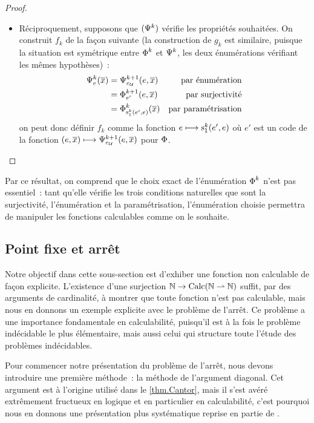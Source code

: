 \begin{proof}
\begin{itemize}
  \item Réciproquement, supposons que $(\Psi_{}^{k})$ vérifie les propriétés
    souhaitées. On construit $f_k$ de la façon suivante (la construction de
    $g_k$ est similaire, puisque la situation est symétrique entre $\operatorname{\Phi}_{}^{k}$
    et $\Psi_{}^{k}$, les deux énumérations vérifiant les mêmes hypothèses)~:
    \begin{align*}
      \Psi_{e}^{k}(\overline{x})
      &= \Psi_{e_{\mathcal{U}}}^{k+1}(e,\overline{x}) &\text{par énumération}\\
      &= \operatorname{\Phi}_{e'}^{k+1}(e,\overline{x}) &\text{par surjectivité}\\
      &= \operatorname{\Phi}_{\mathrm{s}_{1}^{k}(e',e)}^{k}(\overline{x}) &\text{par paramétrisation}
    \end{align*}
    on peut donc définir $f_k$ comme la fonction
    $e \longmapsto \mathrm{s}_{1}^{k}(e',e)$ où $e'$ est un code de la fonction
    $(e, \overline{x}) \longmapsto \Psi_{e_{\mathcal{U}}}^{k+1}(e, \overline{x})$ pour $\operatorname{\Phi}$.
    \qedhere
  \end{itemize}
\end{proof}

Par ce résultat, on comprend que le choix exact de l'énumération $\operatorname{\Phi}_{}^{k}$
n'est pas essentiel~: tant qu'elle vérifie les trois conditions naturelles que
sont la surjectivité, l'énumération et la paramétrisation, l'énumération
choisie permettra de manipuler les fonctions calculables comme on le souhaite.

\subsection{Point fixe et arrêt}

Notre objectif dans cette sous-section est d'exhiber une fonction non calculable
de façon explicite. L'existence d'une surjection
$\mathbb N \to \operatorname{Calc}(\mathbb N \rightharpoonup \mathbb N)$
suffit, par des arguments de cardinalité, à montrer que toute fonction n'est pas
calculable, mais nous en donnons un exemple explicite avec le problème de
l'arrêt. Ce problème a une importance fondamentale en calculabilité, puisqu'il
est à la fois le problème indécidable le plus élémentaire, mais aussi celui
qui structure toute l'étude des problèmes indécidables.

Pour commencer notre présentation du problème de l'arrêt, nous devons introduire
une première méthode~: la méthode de l'argument diagonal. Cet argument est à
l'origine utilisé dans le \cref{thm.Cantor}, mais il s'est avéré extrêmement
fructueux en logique et en particulier en calculabilité, c'est pourquoi nous
en donnons une présentation plus systématique reprise en partie de
\cite{Girard2006}.

